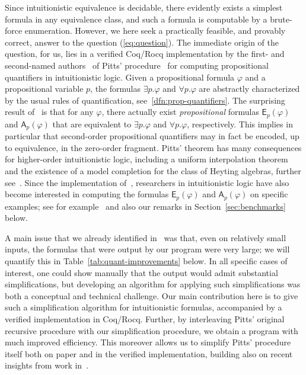 \documentclass[english,final]{jflart}
\newcommand{\Coq}{{Coq/Rocq}}
\theoremstyle{definition}
\theoremstyle{plain}
\newcommand{\Ap}[1]{\mathsf{A}_{p}(#1)}
\newcommand{\Ep}[1]{\mathsf{E}_{p}(#1)}
\renewcommand{\phi}{\varphi}
\begin{document}
Since intuitionistic equivalence is decidable, there evidently exists a simplest formula in any equivalence class, and such a formula is computable by a brute-force enumeration. However, we here seek a practically feasible, and provably correct, answer to the question (\ref{eq:question}).
The immediate origin of the question, for us, lies in a verified {\Coq} implementation by the first- and second-named authors~\cite{FerGoo2023} of Pitts' procedure~\cite{Pit1992} for computing propositional quantifiers in intuitionistic logic. Given a propositional formula $\phi$ and a propositional variable $p$, the formulas $\exists p. \phi$ and $\forall p. \phi$ are abstractly characterized by the usual rules of quantification, see~\cref{dfn:prop-quantifiers}. The surprising result of~\cite{Pit1992} is that for any $\phi$, there actually exist \emph{propositional} formulas $\Ep{\phi}$ and $\Ap{\phi}$ that are equivalent to $\exists p. \phi$ and $\forall p. \phi$, respectively. This implies in particular that second-order propositional quantifiers may in fact be encoded, up to equivalence, in the zero-order fragment. Pitts' theorem has many consequences for higher-order intuitionistic logic, including a uniform interpolation theorem and the existence of a model completion for the class of Heyting algebras, further see~\cite{GhiZaw2002}. Since the implementation of~\cite{FerGoo2023}, researchers in intuitionistic logic have also become interested in computing the formulas $\Ep{\phi}$ and $\Ap{\phi}$ on specific examples; see for example~\cite{Koc2023} and also our remarks in Section~\ref{sec:benchmarks} below.

A main issue that we already identified in~\cite{FerGoo2023} was that, even on relatively small inputs, the formulas that were output by our program were very large; we will quantify this in Table~\ref{tab:quant-improvements} below. In all specific cases of interest, one could show manually that the output would admit substantial simplifications, but developing an algorithm for applying such simplifications was both a conceptual and technical challenge. Our main contribution here is to give such a simplification algorithm for intuitionistic formulas, accompanied by a verified implementation in {\Coq}. Further, by interleaving Pitts' original recursive procedure with our simplification procedure, we obtain a program with much improved efficiency. This moreover allows us to simplify Pitts' procedure itself both on paper and in the verified implementation, building also on recent insights from work in~\cite{FGGS2024}. 
\end{document}
